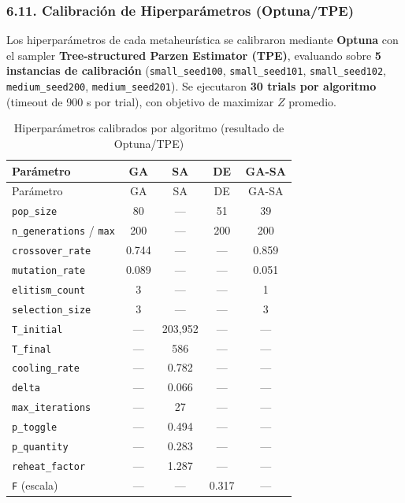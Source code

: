 \documentclass[
  spanish,
  12pt,
]{article}
\begin{document}
\subsubsection{6.11. Calibración de Hiperparámetros
(Optuna/TPE)}\label{calibraciuxf3n-de-hiperparuxe1metros-optunatpe}

Los hiperparámetros de cada metaheurística se calibraron mediante
\textbf{Optuna} con el sampler \textbf{Tree-structured Parzen Estimator
(TPE)}, evaluando sobre \textbf{5 instancias de calibración}
(\texttt{small\_seed100}, \texttt{small\_seed101},
\texttt{small\_seed102}, \texttt{medium\_seed200},
\texttt{medium\_seed201}). Se ejecutaron \textbf{30 trials por
algoritmo} (timeout de 900 s por trial), con objetivo de maximizar \(Z\)
promedio.

\begin{longtable}[]{@{}lcccc@{}}
\caption{\label{tbl:tabla_5e}Hiperparámetros calibrados por algoritmo
(resultado de Optuna/TPE)}\tabularnewline
\toprule\noalign{}
Parámetro & GA & SA & DE & GA-SA \\
\midrule\noalign{}
\endfirsthead
\toprule\noalign{}
Parámetro & GA & SA & DE & GA-SA \\
\midrule\noalign{}
\endhead
\bottomrule\noalign{}
\endlastfoot
\texttt{pop\_size} & 80 & --- & 51 & 39 \\
\texttt{n\_generations} / \texttt{max} & 200 & --- & 200 & 200 \\
\texttt{crossover\_rate} & 0.744 & --- & --- & 0.859 \\
\texttt{mutation\_rate} & 0.089 & --- & --- & 0.051 \\
\texttt{elitism\_count} & 3 & --- & --- & 1 \\
\texttt{selection\_size} & 3 & --- & --- & 3 \\
\texttt{T\_initial} & --- & 203,952 & --- & --- \\
\texttt{T\_final} & --- & 586 & --- & --- \\
\texttt{cooling\_rate} & --- & 0.782 & --- & --- \\
\texttt{delta} & --- & 0.066 & --- & --- \\
\texttt{max\_iterations} & --- & 27 & --- & --- \\
\texttt{p\_toggle} & --- & 0.494 & --- & --- \\
\texttt{p\_quantity} & --- & 0.283 & --- & --- \\
\texttt{reheat\_factor} & --- & 1.287 & --- & --- \\
\texttt{F} (escala) & --- & --- & 0.317 & --- \\

\end{longtable}
\end{document}
